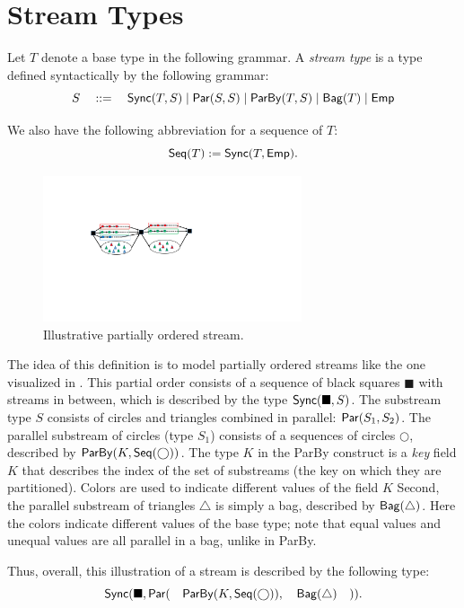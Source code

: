 \section{Stream Types}

\begin{definition}
Let $T$ denote a base type in the following grammar.
A \emph{stream type} is a type defined syntactically by the following grammar:
\[
  S \quad ::= \quad
    \mathsf{Sync}({T}, S) \mid
    \mathsf{Par}({S}, {S}) \mid
    \mathsf{ParBy}({T}, S) \mid
    \mathsf{Bag}({T}) \mid
    \mathsf{Emp}{}
\]
\end{definition}

We also have the following abbreviation for a sequence of $T$:
\[
  \mathsf{Seq}({T}) := \mathsf{Sync}({T}, \mathsf{Emp}{}).
\]

\begin{figure}
  \centering
  \includegraphics[width=3in]{figures/synchschemas/SPS2.pdf}
  \caption{Illustrative partially ordered stream.}
  \label{fig:ex-postream}
\end{figure}

The idea of this definition is to model partially ordered streams like the one visualized in .
This partial order consists of a sequence of black squares $\blacksquare$ with streams in between, which is described by the type $\mathsf{Sync}({\blacksquare}, S)$.
The substream type $S$ consists of circles and triangles combined in parallel: $\mathsf{Par}({S_1}, {S_2})$.
The parallel substream of circles (type $S_1$) consists of a sequences of circles $\bigcirc$, described by $\mathsf{ParBy}({K}, \mathsf{Seq}({\bigcirc}))$.
The type $K$ in the ParBy construct is a \emph{key} field $K$ that describes the index of the set of substreams (the key on which they are partitioned).
Colors are used to indicate different values of the field $K$
Second, the parallel substream of triangles $\triangle$ is simply a bag, described by $\mathsf{Bag}({\triangle})$.
Here the colors indicate different values of the base type; note that equal values and unequal values are all parallel in a bag, unlike in ParBy.

Thus, overall, this illustration of a stream is described by the following type:
\[
\mathsf{Sync}({\blacksquare}, \mathsf{Par}({ \quad \mathsf{ParBy}({K}, \mathsf{Seq}({\bigcirc}))}, {\quad \mathsf{Bag}({\triangle}) \quad})).
\]

